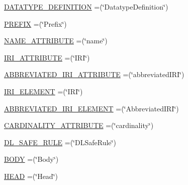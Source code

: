 \begin{DoxyCompactItemize}
\item 
\hyperlink{enumorg_1_1semanticweb_1_1owlapi_1_1vocab_1_1_o_w_l_x_m_l_vocabulary_afa2f8900deb4e257be02cd5d47c7fb7b}{D\-A\-T\-A\-T\-Y\-P\-E\-\_\-\-D\-E\-F\-I\-N\-I\-T\-I\-O\-N} =(\char`\"{}Datatype\-Definition\char`\"{})
\item 
\hyperlink{enumorg_1_1semanticweb_1_1owlapi_1_1vocab_1_1_o_w_l_x_m_l_vocabulary_a9b39f7606779f01bb06caa166fb6c2d4}{P\-R\-E\-F\-I\-X} =(\char`\"{}Prefix\char`\"{})
\item 
\hyperlink{enumorg_1_1semanticweb_1_1owlapi_1_1vocab_1_1_o_w_l_x_m_l_vocabulary_ae7763730fd123eb5b9060780c1c8a85e}{N\-A\-M\-E\-\_\-\-A\-T\-T\-R\-I\-B\-U\-T\-E} =(\char`\"{}name\char`\"{})
\item 
\hyperlink{enumorg_1_1semanticweb_1_1owlapi_1_1vocab_1_1_o_w_l_x_m_l_vocabulary_ab13217ef5f14a343d516ca3b6720be6c}{I\-R\-I\-\_\-\-A\-T\-T\-R\-I\-B\-U\-T\-E} =(\char`\"{}I\-R\-I\char`\"{})
\item 
\hyperlink{enumorg_1_1semanticweb_1_1owlapi_1_1vocab_1_1_o_w_l_x_m_l_vocabulary_acec58caddca98ba4a22b09d3508d3979}{A\-B\-B\-R\-E\-V\-I\-A\-T\-E\-D\-\_\-\-I\-R\-I\-\_\-\-A\-T\-T\-R\-I\-B\-U\-T\-E} =(\char`\"{}abbreviated\-I\-R\-I\char`\"{})
\item 
\hyperlink{enumorg_1_1semanticweb_1_1owlapi_1_1vocab_1_1_o_w_l_x_m_l_vocabulary_ac03a1e78a97c26cd3cfe817085652d12}{I\-R\-I\-\_\-\-E\-L\-E\-M\-E\-N\-T} =(\char`\"{}I\-R\-I\char`\"{})
\item 
\hyperlink{enumorg_1_1semanticweb_1_1owlapi_1_1vocab_1_1_o_w_l_x_m_l_vocabulary_a66dcc040c8bf102f3a9071841d8d70c8}{A\-B\-B\-R\-E\-V\-I\-A\-T\-E\-D\-\_\-\-I\-R\-I\-\_\-\-E\-L\-E\-M\-E\-N\-T} =(\char`\"{}Abbreviated\-I\-R\-I\char`\"{})
\item 
\hyperlink{enumorg_1_1semanticweb_1_1owlapi_1_1vocab_1_1_o_w_l_x_m_l_vocabulary_adeaf0ef01603d0badbe583d27f7815af}{C\-A\-R\-D\-I\-N\-A\-L\-I\-T\-Y\-\_\-\-A\-T\-T\-R\-I\-B\-U\-T\-E} =(\char`\"{}cardinality\char`\"{})
\item 
\hyperlink{enumorg_1_1semanticweb_1_1owlapi_1_1vocab_1_1_o_w_l_x_m_l_vocabulary_ae7432e7bb0180024d08e94a73b0d500c}{D\-L\-\_\-\-S\-A\-F\-E\-\_\-\-R\-U\-L\-E} =(\char`\"{}D\-L\-Safe\-Rule\char`\"{})
\item 
\hyperlink{enumorg_1_1semanticweb_1_1owlapi_1_1vocab_1_1_o_w_l_x_m_l_vocabulary_ad3607c5aa3f490aab23abcfaa3e3eef4}{B\-O\-D\-Y} =(\char`\"{}Body\char`\"{})
\item 
\hyperlink{enumorg_1_1semanticweb_1_1owlapi_1_1vocab_1_1_o_w_l_x_m_l_vocabulary_a353231947ed93c8c3739f22ecb3d9263}{H\-E\-A\-D} =(\char`\"{}Head\char`\"{})

\end{DoxyCompactItemize}
